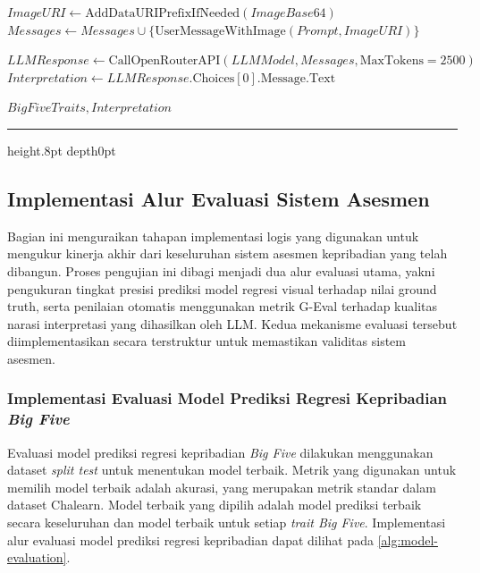 {\begin{algorithmic}[1]
		\State $ImageURI \gets \text{AddDataURIPrefixIfNeeded}(ImageBase64)$
		\State $Messages \gets Messages \cup \{\text{UserMessageWithImage}(Prompt, ImageURI)\}$
		
		\State $LLMResponse \gets \text{CallOpenRouterAPI}(LLMModel, Messages, \text{MaxTokens}=2500)$ 
		\State $Interpretation \gets LLMResponse.\text{Choices}[0].\text{Message}.\text{Text}$
		
		\State \Return $BigFiveTraits, Interpretation$
		\EndProcedure
	\end{algorithmic}
	
	\nopagebreak
	\kern2pt\hrule height.8pt depth0pt \kern15pt 
	\nopagebreak
	
	\label{alg:interpretation-api}
}


\subsection{Implementasi Alur Evaluasi Sistem Asesmen}

Bagian ini menguraikan tahapan implementasi logis yang digunakan untuk mengukur kinerja akhir dari keseluruhan sistem asesmen kepribadian yang telah dibangun. Proses pengujian ini dibagi menjadi dua alur evaluasi utama, yakni pengukuran tingkat presisi prediksi model regresi visual terhadap nilai ground truth, serta penilaian otomatis menggunakan metrik G-Eval terhadap kualitas narasi interpretasi yang dihasilkan oleh LLM. Kedua mekanisme evaluasi tersebut diimplementasikan secara terstruktur untuk memastikan validitas sistem asesmen.

\subsubsection{Implementasi Evaluasi Model Prediksi Regresi Kepribadian \textit{Big Five}}

Evaluasi model prediksi regresi kepribadian \textit{Big Five} dilakukan menggunakan dataset \textit{split test} untuk menentukan model terbaik. Metrik yang digunakan untuk memilih model terbaik adalah akurasi, yang merupakan metrik standar dalam dataset Chalearn. Model terbaik yang dipilih adalah model prediksi terbaik secara keseluruhan dan model terbaik untuk setiap \textit{trait Big Five}. Implementasi alur evaluasi model prediksi regresi kepribadian dapat dilihat pada \autoref{alg:model-evaluation}. 

